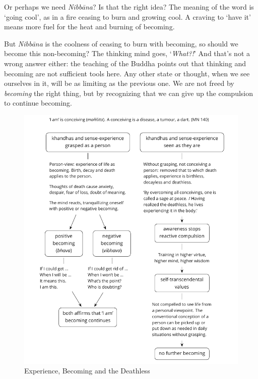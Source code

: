 Or perhaps we need \emph{Nibbāna}? Is that the right idea? The meaning
of the word is `going cool', as in a fire ceasing to burn and growing
cool. A craving to `have it' means more fuel for the heat and burning of
becoming.

But \emph{Nibbāna} is the coolness of ceasing to burn with becoming, so
should we become this non-becoming? The thinking mind goes,
`\emph{What?!}' And that's not a wrong answer either: the teaching of
the Buddha points out that thinking and becoming are not sufficient
tools here. Any other state or thought, when we see ourselves in it,
will be as limiting as the previous one. We are not freed by
\emph{becoming} the right thing, but by recognizing that we can give up
the compulsion to continue becoming.

\clearpage
\figurepagelayout

\begin{figure}[h]
\caption{Experience, Becoming and the Deathless}\label{fig-experience-becoming-deathless}
\bigskip
\includegraphics[width=\linewidth]{./manuscript/tex/diagrams/experience-becoming-deathless.pdf}
\end{figure}

